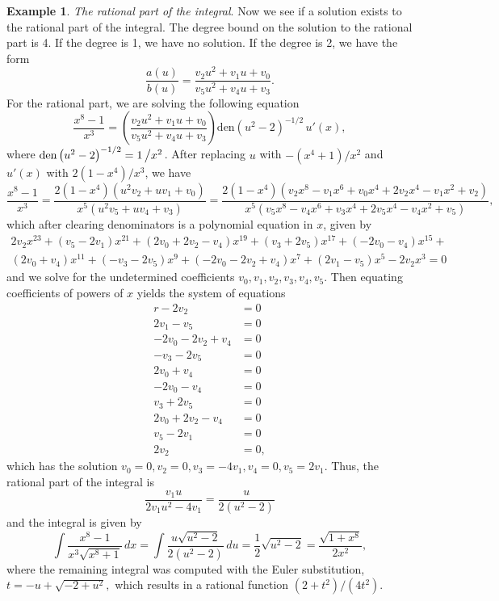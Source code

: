\documentclass[12pt]{article}
\numberwithin{equation}{section}
\theoremstyle{definition}
\newtheorem{example}{Example}[section]
\begin{document}
\begin{example}
\noindent\textit{The rational part of the integral}. Now we see if a solution exists to the rational part 
of the integral. The degree bound on the solution to the rational part is 4. If the degree is 
1, we have no solution. If the degree is 2, we have the form 
$$\frac{a(u)}{b(u)}=\frac{v_2u^2+v_1u+v_0}{v_5u^2+v_4u+v_3}.$$
For the rational part, we are solving the following equation
$$\frac{x^8-1}{x^3}=\left(\frac{v_2u^2+v_1u+v_0}{v_5u^2+v_4u+v_3}\right)\text{den}\left(u^2-2\right)^{-1/2}\,u'(x),$$
where $\text{den}\left(u^2-2\right)^{-1/2}=1\left/x^2\right.$. 
After replacing $u$ with $-\left(x^4+1\right)/x^2$ and $u'(x)$ with $2\left(1 - x^4\right)/x^3$, we have
$$\frac{x^8-1}{x^3}
=\frac{2\left(1 - x^4\right) \left(u^2 v_2+u v_1+v_0\right)}{x^5 \left(u^2 v_5+u v_4+v_3\right)}
=\frac{2\left(1 - x^4\right) \left(v_2x^8-v_1 x^6+v_0 x^4+2 v_2 x^4-v_1 x^2+v_2\right)}{x^5 \left(v_5 x^8-v_4 x^6+v_3 x^4+2 v_5 x^4-v_4 x^2+v_5\right)},$$
which after clearing denominators is a polynomial equation in $x$, given by
\begin{multline*}
2 v_2 x^{23}+\left(v_5-2 v_1\right) x^{21}+\left(2 v_0+2 v_2-v_4\right) x^{19}+\left(v_3+2 v_5\right) x^{17}+\left(-2 v_0-v_4\right) x^{15}+\\
\left(2v_0+v_4\right) x^{11}+\left(-v_3-2 v_5\right) x^9+\left(-2 v_0-2 v_2+v_4\right) x^7+\left(2 v_1-v_5\right) x^5-2 v_2 x^3=0
\end{multline*}
and we solve for the undetermined coefficients $v_0,v_1,v_2,v_3,v_4,v_5$. Then equating 
coefficients of powers of $x$ yields the system of equations
\begin{align*}{r}
 -2 v_2&=0 \\
 2 v_1-v_5&=0 \\
 -2 v_0-2 v_2+v_4&=0 \\
 -v_3-2 v_5&=0 \\
 2 v_0+v_4&=0 \\
 -2 v_0-v_4&=0 \\
 v_3+2 v_5&=0 \\
 2 v_0+2 v_2-v_4&=0 \\
 v_5-2 v_1&=0 \\
 2 v_2&=0,
\end{align*}
which has the solution $v_0=0, v_2=0, v_3=-4 v_1, v_4=0, v_5=2 v_1$. Thus, the rational part 
of the integral is
$$\frac{v_1u}{2 v_1u^2-4 v_1}=\frac{u}{2 \left(u^2-2\right)}$$
and the integral is given by
$$\int \frac{x^8-1}{x^3 \sqrt{x^8+1}} \, dx=\int \frac{u\sqrt{u^2-2}}{2 \left(u^2-2\right)} \, du=\frac{1}{2} \sqrt{u^2-2}=\frac{\sqrt{1+x^8}}{2x^2},$$
where the remaining integral was computed with the Euler substitution, $t=-u+\sqrt{-2+u^2},$ which 
results in a rational function $\left(2+t^2\right)/\left(4t^2\right)$.
\end{example}
\fi
\end{document}
